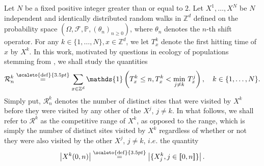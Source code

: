 \documentclass[12pt]{article}
\newcommand{\R}{\mathcal R}
\newcommand{\PP}{\mathbb P}
\newcommand{\1}{\mathds{1}}
\newcommand{\ZZ}{\mathbb Z}
\newcommand{\eqdef}{\stackrel{\scaleto{\mathrm{def}}{3.5pt}}{=}}
\numberwithin{equation}{section}
\begin{document}
Let $N$ be a fixed positive integer greater than or equal to $2$. Let $X^1,\dots,X^N$ be $N$ independent and identically distributed random walks in $\ZZ^d$ defined on the probability space $\left(\Omega,\mathcal F,\PP,\left(\theta_n\right)_{n\ge0}\right)$, where $\theta_n$ denotes the $n$-th shift operator. For any $k\in\{1,\dots,N\},x\in\ZZ^d$, we let $T_x^k$ denote the first hitting time of $x$ by $X^k$. In this work, motivated by questions in ecology of populations stemming from \cite{Bansaye2024}, we shall study the quantities
\begin{equation*}
    \R_n^k\eqdef\sum_{x\in\ZZ^d}\1\left(T_x^k\le n,T_x^k<\underset{j\ne k}\min \ T_x^j\right),\quad k\in\{1,\dots,N\}.
\end{equation*}
Simply put, $\R_n^k$ denotes the number of distinct sites that were visited by $X^k$ before they were visited by any other of the $X^j$, $j\ne k$. In what follows, we shall refer to $\R^k$ as the competitive range of $X^k$, as opposed to the range, which is simply the number of distinct sites visited by $X^k$ regardless of whether or not they were also visited by the other $X^j$, $j\ne k$, $i.e.$ the quantity
\begin{equation*}
    \left|X^k(0,n)\right|\eqdef\left|\{X_j^k, j\in[\![0,n]\!]\}\right|.
\end{equation*} 
\end{document}
